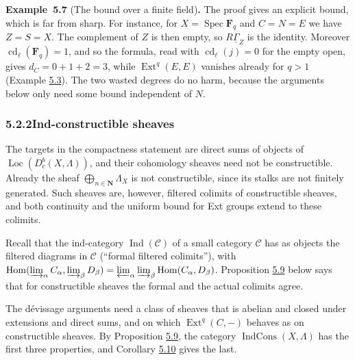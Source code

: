 \documentclass[11pt]{article}
\newenvironment{bpstatement}[2]{\par\addvspace{0.6\baselineskip}\noindent\textbf{#1}#2\textbf{.}\enspace\ignorespaces}
  {\par\addvspace{0.4\baselineskip}}
\providecommand{\Dbc}{}\renewcommand{\Dbc}{D^b_c}
\providecommand{\Ext}{}\renewcommand{\Ext}{\operatorname{Ext}}
\providecommand{\Hom}{}\renewcommand{\Hom}{\operatorname{Hom}}
\providecommand{\IndCons}{}\renewcommand{\IndCons}{\operatorname{IndCons}}
\providecommand{\Loc}{}\renewcommand{\Loc}{\operatorname{Loc}}
\begin{document}
\label{bp23}%
\begin{bpstatement}{Example~5.7}{ (The bound over a finite field)}
The proof gives an explicit bound, which is far from sharp. For instance, for \(X=\operatorname{Spec}\mathbf F_q\) and \(C=N=E\) we have \(Z=S=X\). The complement of \(Z\) is then empty, so \(R\underline\Gamma_Z\) is the identity. Moreover \(\operatorname{cd}_\ell(\mathbf F_q)=1\), and so the formula, read with \(\operatorname{cd}_\ell(j)=0\) for the empty open, gives \(d_C=0+1+2=3\), while \(\Ext^q(E,E)\) vanishes already for \(q>1\) (Example \hyperref[bp11]{5.3}). The two wasted degrees do no harm, because the arguments below only need some bound independent of \(N\).
\end{bpstatement}


\subsubsection*{\texorpdfstring{5.2.2\quad Ind-constructible sheaves}{5.2.2 Ind-constructible sheaves}}
\label{bp24}%
\label{bp25}%
The targets in the compactness statement are direct sums of objects of \(\Loc(\Dbc(X,\Lambda))\), and their cohomology sheaves need not be constructible. Already the sheaf \(\bigoplus_{n\in\mathbf N}\Lambda_X\) is not constructible, since its stalks are not finitely generated. Such sheaves are, however, filtered colimits of constructible sheaves, and both continuity and the uniform bound for Ext groups extend to these colimits.

Recall that the ind-category \(\operatorname{Ind}(\mathcal C)\) of a small category \(\mathcal C\) has as objects the filtered diagrams in \(\mathcal C\) (“formal filtered colimits”), with \(\Hom(\varinjlim_\alpha C_\alpha,\varinjlim_\beta D_\beta)
=\varprojlim_\alpha\varinjlim_\beta\Hom(C_\alpha,D_\beta)\). Proposition \hyperref[bp27]{5.9} below says that for constructible sheaves the formal and the actual colimits agree.

The dévissage arguments need a class of sheaves that is abelian and closed under extensions and direct sums, and on which \(\Ext^q(C,-)\) behaves as on constructible sheaves. By Proposition \hyperref[bp27]{5.9}, the category \(\IndCons(X,\Lambda)\) has the first three properties, and Corollary \hyperref[bp30]{5.10} gives the last.
\end{document}

